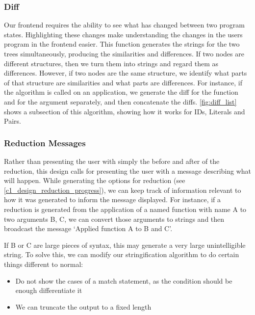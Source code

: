 \subsubsection{Diff}
\label{paragraph:diff} 
Our frontend requires the ability to see what has changed between two program states. Highlighting these changes make understanding the changes in the users program in the frontend easier. This function generates the strings for the two trees simultaneously, producing the similarities and differences. If two nodes are different structures, then we turn them into strings and regard them as differences. However, if two nodes are the same structure, we identify what parts of that structure are similarities and what parts are differences. For instance, if the algorithm is called on an application, we generate the diff for the function and for the argument separately, and then concatenate the diffs. \ref{fig:diff_list} shows a subsection of this algorithm, showing how it works for IDs, Literals and Pairs. 


\subsubsection{Reduction Messages}
Rather than presenting the user with simply the before and after of the reduction, this design calls for presenting the user with a message describing what will happen. While generating the options for reduction (see \ref{c1_design_reduction_progress}), we can keep track of information relevant to how it was generated to inform the message displayed. For instance, if a reduction is generated from the application of a named function with name A to two arguments B, C, we can convert those arguments to strings and then broadcast the message `Applied function A to B and C'. 

If B or C are large pieces of syntax, this may generate a very large unintelligible string. To solve this, we can modify our stringification algorithm to do certain things different to normal:
\begin{itemize}
    \item Do not show the cases of a match statement, as the condition should be enough differentiate it
    \item We can truncate the output to a fixed length 
\end{itemize}

